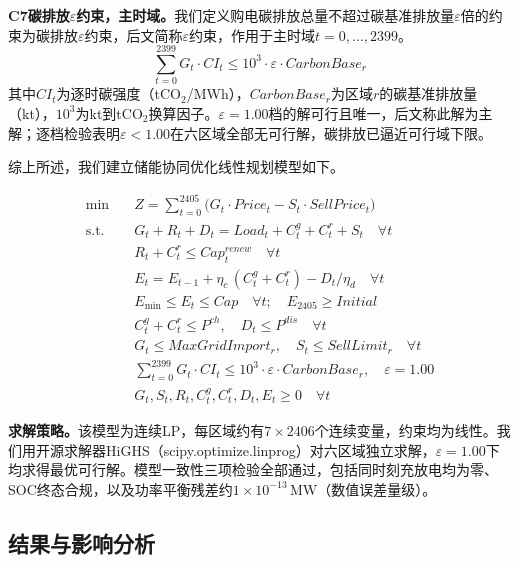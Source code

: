 \textbf{C7\quad 碳排放$\varepsilon$约束，主时域。}我们定义购电碳排放总量不超过碳基准排放量$\varepsilon$倍的约束为碳排放$\varepsilon$约束，后文简称$\varepsilon$约束，作用于主时域$t=0,\ldots,2399$。
\begin{equation}
\sum_{t=0}^{2399} G_t \cdot CI_t \le 10^3 \cdot \varepsilon \cdot CarbonBase_r
\end{equation}
其中$CI_t$为逐时碳强度（tCO$_2$/MWh），$CarbonBase_r$为区域$r$的碳基准排放量（kt），$10^3$为kt到tCO$_2$换算因子。$\varepsilon=1.00$档的解可行且唯一，后文称此解为主解；逐档检验表明$\varepsilon<1.00$在六区域全部无可行解，碳排放已逼近可行域下限。

综上所述，我们建立储能协同优化线性规划模型如下。

\begin{equation}
\begin{aligned}
\min \quad & Z = \sum_{t=0}^{2405} \bigl(G_t \cdot Price_t - S_t \cdot SellPrice_t\bigr) \\
\text{s.t.} \quad & G_t + R_t + D_t = Load_t + C^g_t + C^r_t + S_t \quad \forall t \\
& R_t + C^r_t \le Cap^{renew}_t \quad \forall t \\
& E_t = E_{t-1} + \eta_c\,(C^g_t + C^r_t) - D_t/\eta_d \quad \forall t \\
& E_{\min} \le E_t \le Cap \quad \forall t;\quad E_{2405} \ge Initial \\
& C^g_t + C^r_t \le P^{ch},\quad D_t \le P^{dis} \quad \forall t \\
& G_t \le MaxGridImport_r,\quad S_t \le SellLimit_r \quad \forall t \\
& \sum_{t=0}^{2399} G_t \cdot CI_t \le 10^3 \cdot \varepsilon \cdot CarbonBase_r,\quad \varepsilon=1.00 \\
& G_t, S_t, R_t, C^g_t, C^r_t, D_t, E_t \ge 0 \quad \forall t
\end{aligned}
\end{equation}

\medskip\noindent\textbf{求解策略。}该模型为连续LP，每区域约有$7\times2406$个连续变量，约束均为线性。我们用开源求解器HiGHS（scipy.optimize.linprog）对六区域独立求解，$\varepsilon=1.00$下均求得最优可行解。模型一致性三项检验全部通过，包括同时刻充放电均为零、SOC终态合规，以及功率平衡残差约$1\times10^{-13}$\,MW（数值误差量级）。

\subsection{结果与影响分析}

